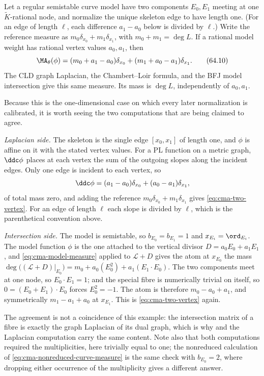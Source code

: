 \begin{example}
\label{ex:cma-semistable-curve}
Let a regular semistable curve model have two components $E_0,E_1$
meeting at one $\widetilde K$-rational node, and normalize the unique skeleton edge to have length
one.  (For an edge of length $\ell$, each difference
$a_1-a_0$ below is divided by $\ell$.)
Write the reference measure as
$m_0\delta_{x_0}+m_1\delta_{x_1}$, with
$m_0+m_1=\deg L$.
If a rational model weight has rational vertex values $a_0,a_1$, then
\[
 \MA_\theta(\phi)
 =(m_0+a_1-a_0)\delta_{x_0}
 +(m_1+a_0-a_1)\delta_{x_1}.
\tag{64.10}\label{eq:cma-two-vertex}
\]
The CLD graph Laplacian, the Chambert--Loir formula, and the BFJ model
intersection give this same measure.
Its mass is $\deg L$, independently of $a_0,a_1$.

Because this is the one-dimensional case on which every later normalization
is calibrated, it is worth seeing the two computations that are being
claimed to agree.

\emph{Laplacian side.}  The skeleton is the single edge $[x_0,x_1]$ of
length one, and $\phi$ is affine on it with the stated vertex values.  For
a PL function on a metric graph, $\ddc\phi$ places at each vertex the sum
of the outgoing slopes along the incident edges.  Only one edge is
incident to each vertex, so
\[
 \ddc\phi=(a_1-a_0)\delta_{x_0}+(a_0-a_1)\delta_{x_1},
\]
of total mass zero, and adding the reference
$m_0\delta_{x_0}+m_1\delta_{x_1}$ gives
\eqref{eq:cma-two-vertex}.  For an edge of length $\ell$ each slope is
divided by $\ell$, which is the parenthetical convention above.

\emph{Intersection side.}  The model is semistable, so $b_{E_0}=b_{E_1}=1$
and $x_{E_i}=\ord_{E_i}$.  The model function $\phi$ is the one attached
to the vertical divisor $D=a_0E_0+a_1E_1$, and
\eqref{eq:cma-model-measure} applied to $\mathcal L+D$ gives the atom at
$x_{E_0}$ the mass $\deg\bigl((\mathcal L+D)|_{E_0}\bigr)
 =m_0+a_0(E_0^2)+a_1(E_1\cdot E_0)$.
The two components meet at one node, so $E_0\cdot E_1=1$; and the special
fibre is numerically trivial on itself, so
$0=(E_0+E_1)\cdot E_0$ forces $E_0^2=-1$.  The atom is therefore
$m_0-a_0+a_1$, and symmetrically $m_1-a_1+a_0$ at $x_{E_1}$.  This is
\eqref{eq:cma-two-vertex} again.

The agreement is not a coincidence of this example: the intersection matrix
of a fibre is exactly the graph Laplacian of its dual graph, which is why
 and the Laplacian computation carry the same
content.  Note also that both computations required the multiplicities, here
trivially equal to one; the nonreduced calculation of
\eqref{eq:cma-nonreduced-curve-measure} is the same check with
$b_{E_0}=2$, where dropping either occurrence of the multiplicity gives a
different answer.
\end{example}

